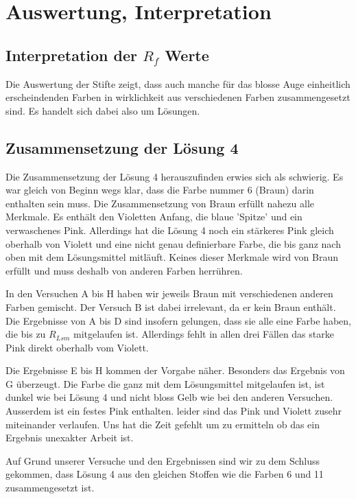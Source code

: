 \documentclass[11pt,paper=a4,final]{scrartcl}
\begin{document}
\section{Auswertung, Interpretation}
\subsection{Interpretation der \(R_f\) Werte}
Die Auswertung der Stifte zeigt, dass auch manche f\"ur das blosse Auge einheitlich erscheindenden Farben in wirklichkeit aus verschiedenen Farben zusammengesetzt sind. Es handelt sich dabei also um L\"osungen. 
\subsection{Zusammensetzung der L\"osung 4}
Die Zusammensetzung der L\"osung 4 herauszufinden erwies sich als schwierig. Es war gleich von Beginn wegs klar, dass die Farbe nummer 6 (Braun) darin enthalten sein muss. Die Zusammensetzung von Braun erf\"ullt nahezu alle Merkmale. Es enth\"alt den Violetten Anfang, die blaue 'Spitze' und ein verwaschenes Pink. Allerdings hat die L\"osung 4 noch ein st\"arkeres Pink gleich oberhalb von Violett und eine nicht genau definierbare Farbe, die bis ganz nach oben mit dem L\"osungsmittel mitl\"auft. Keines dieser Merkmale wird von Braun erf\"ullt und muss deshalb von anderen Farben herr\"uhren.

In den Versuchen A bis H haben wir jeweils Braun mit verschiedenen anderen Farben gemischt. Der Versuch B ist dabei irrelevant, da er kein Braun enth\"alt. Die Ergebnisse von A bis D sind insofern gelungen, dass sie alle eine Farbe haben, die bis zu \(R_{Lsm}\) mitgelaufen ist. Allerdings fehlt in allen drei F\"allen das starke Pink direkt oberhalb vom Violett.

Die Ergebnisse E bis H kommen der Vorgabe n\"aher. Besonders das Ergebnis von G \"uberzeugt. Die Farbe die ganz mit dem L\"osungsmittel mitgelaufen ist, ist dunkel wie bei L\"osung 4 und nicht bloss Gelb wie bei den anderen Versuchen. Ausserdem ist ein festes Pink enthalten. leider sind das Pink und Violett zusehr miteinander verlaufen. Uns hat die Zeit gefehlt um zu ermitteln ob das ein Ergebnis unexakter Arbeit ist.

Auf Grund unserer Versuche und den Ergebnissen sind wir zu dem Schluss gekommen, dass L\"osung 4 aus den gleichen Stoffen wie die Farben 6 und 11 zusammengesetzt ist.
\end{document}
